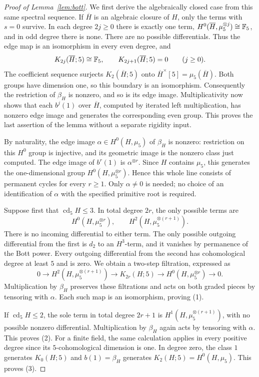 \begin{proof}[Proof of Lemma~\ref{lem:bott}]
We first derive the algebraically closed case from this same spectral
sequence. If $\overline H$ is an algebraic closure of $H$, only the
terms with $s=0$ survive. In each degree $2j\geq0$ there is exactly one
term, $H^0(\overline H,\mu_5^{\otimes j})\cong\mathbb F_5$, and in odd
degree there is none. There are no possible differentials. Thus the
edge map is an isomorphism in every even degree, and
\[
 K_{2j}(\overline H;5)\cong\mathbb F_5,\qquad
 K_{2j+1}(\overline H;5)=0\qquad(j\geq0).
\]
The coefficient sequence surjects
$K_2(\overline H;5)$ onto $\overline H^\times[5]=\mu_5(\overline H)$.
Both groups have dimension one, so this boundary is an isomorphism.
Consequently the restriction of $\beta_H$ is nonzero, and so is its
edge image. Multiplicativity now shows that each $b^j(1)$ over
$\overline H$, computed by iterated left multiplication, has nonzero
edge image and generates the corresponding even group. This proves
the last assertion of the lemma without a
separate rigidity input.

By naturality, the edge image
$\alpha\in H^0(H,\mu_5)$ of $\beta_H$ is nonzero: restriction on this
$H^0$ group is injective, and its geometric image is the nonzero class
just computed. The edge image of $b^r(1)$ is
$\alpha^{\otimes r}$. Since $H$ contains $\mu_5$, this generates the
one-dimensional group $H^0(H,\mu_5^{\otimes r})$. Hence this whole
line consists of permanent cycles for every $r\geq1$. Only
$\alpha\ne0$ is needed; no choice of an identification of $\alpha$
with the specified primitive root is required.

Suppose first that $\operatorname{cd}_5H\leq3$.  In total degree
$2r$, the only possible terms are
\[
 H^0(H,\mu_5^{\otimes r}),\qquad
 H^2(H,\mu_5^{\otimes(r+1)}).
\]
There is no incoming differential to either term.  The only possible
outgoing differential from the first is $d_2$ to an $H^3$-term, and
it vanishes by permanence of the Bott power.  Every outgoing
differential from the second has cohomological degree at least $5$
and is zero.  We obtain a two-step filtration, expressed as
\begin{equation}
\label{eq:even-field-filtration}
 0\longrightarrow H^2(H,\mu_5^{\otimes(r+1)})
 \longrightarrow K_{2r}(H;5)
 \longrightarrow H^0(H,\mu_5^{\otimes r})
 \longrightarrow0.
\end{equation}
Multiplication by $\beta_H$ preserves these filtrations and acts on
both graded pieces by tensoring with $\alpha$.  Each such map is an
isomorphism, proving (1).

If $\operatorname{cd}_5H\leq2$, the sole term in total degree
$2r+1$ is $H^1(H,\mu_5^{\otimes(r+1)})$, with no possible nonzero
differential.  Multiplication by $\beta_H$ again acts by tensoring
with $\alpha$.  This proves (2).  For a finite field, the same
calculation applies in every positive degree since its
$5$-cohomological dimension is one.  In degree zero, the class $1$
generates $K_0(H;5)$ and $b(1)=\beta_H$ generates
$K_2(H;5)=H^0(H,\mu_5)$.  This proves (3).
\end{proof}
